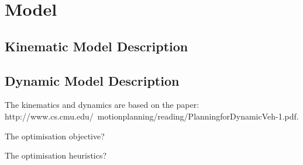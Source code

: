 \chapter{Model}

\section{Kinematic Model Description}

\section{Dynamic Model Description}

The kinematics and dynamics are based on the paper: http://www.cs.cmu.edu/~motionplanning/reading/PlanningforDynamicVeh-1.pdf.

The optimisation objective?

The optimisation heuristics?
